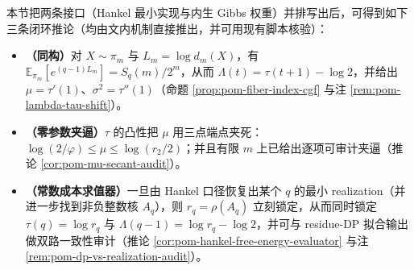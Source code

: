 \begin{remark}\label{rem:pom-interface-loop-collision-loss}
本节把两条接口（Hankel 最小实现与内生 Gibbs 权重）并排写出后，可得到如下三条闭环推论（均由文内机制直接推出，并可用现有脚本核验）：
\begin{itemize}
  \item \textbf{（同构）}对 \(X\sim\pi_m\) 与 \(L_m=\log d_m(X)\)，有
  \(\mathbb{E}_{\pi_m}[e^{(q-1)L_m}]=S_q(m)/2^m\)，从而 \(\Lambda(t)=\tau(t+1)-\log2\)，并给出 \(\mu=\tau'(1)\)、\(\sigma^2=\tau''(1)\)（命题 \ref{prop:pom-fiber-index-cgf} 与注 \ref{rem:pom-lambda-tau-shift}）。
  \item \textbf{（零参数夹逼）}\(\tau\) 的凸性把 \(\mu\) 用三点端点夹死：\(\log(2/\varphi)\le \mu\le \log(r_2/2)\)；并且有限 \(m\) 上已给出逐项可审计夹逼（推论 \ref{cor:pom-mu-secant-audit}）。
  \item \textbf{（常数成本求值器）}一旦由 Hankel 口径恢复出某个 \(q\) 的最小 realization（并进一步找到非负整数核 \(A_q\)），则 \(r_q=\rho(A_q)\) 立刻锁定，从而同时锁定 \(\tau(q)=\log r_q\) 与 \(\Lambda(q-1)=\log r_q-\log2\)，并可与 residue-DP 拟合输出做双路一致性审计（推论 \ref{cor:pom-hankel-free-energy-evaluator} 与注 \ref{rem:pom-dp-vs-realization-audit}）。
\end{itemize}
\end{remark}

